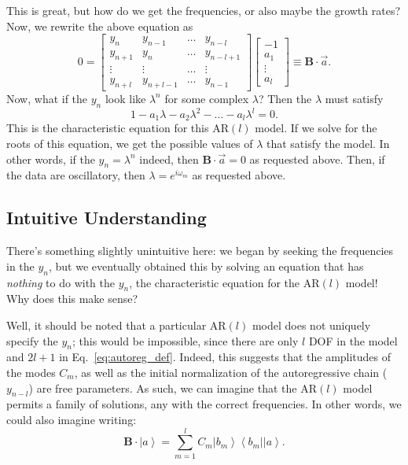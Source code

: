 \documentclass[12pt]{article}
\newcommand*{\bm}[1]{\boldsymbol{\mathbf{#1}}}
\newcommand*{\bra}[1]{\left<#1\right|}
\newcommand*{\ket}[1]{\left|#1\right>}
\begin{document}
This is great, but how do we get the frequencies, or also maybe the growth
rates? Now, we rewrite the above equation as
\begin{equation}
    0 =
    \begin{bmatrix}
        y_{n} & y_{n - 1} & \dots & y_{n - l}\\
        y_{n + 1} & y_{n} & \dots & y_{n - l + 1}\\
        \vdots & \vdots & \dots & \vdots\\
        y_{n + l} & y_{n + l - 1} & \dots & y_{n - 1}
    \end{bmatrix}
    \begin{bmatrix}
        -1\\
        a_1\\
        \vdots\\
        a_l
    \end{bmatrix} \equiv \bm{B} \cdot \vec{a}.
\end{equation}
Now, what if the $y_n$ look like $\lambda^n$ for some complex $\lambda$? Then
the $\lambda$ must satisfy
\begin{equation}
    1 - a_1\lambda - a_2\lambda^2 - \dots - a_l\lambda^l = 0.
\end{equation}
This is the characteristic equation for this $\mathrm{AR}(l)$ model. If we solve
for the roots of this equation, we get the possible values of $\lambda$ that
satisfy the model. In other words, if the $y_n = \lambda^n$ indeed, then $\bm{B}
\cdot \vec{a} = 0$ as requested above. Then, if the data are oscillatory, then
$\lambda = e^{i\omega_m}$ as requested above.

\subsection{Intuitive Understanding}

There's something slightly unintuitive here: we began by seeking the frequencies
in the $y_n$, but we eventually obtained this by solving an equation that has
\emph{nothing} to do with the $y_n$, the characteristic equation for the
$\mathrm{AR}(l)$ model! Why does this make sense?

Well, it should be noted that a particular $\mathrm{AR}(l)$ model does not
uniquely specify the $y_n$; this would be impossible, since there are only $l$
DOF in the model and $2l + 1$ in Eq.~\eqref{eq:autoreg_def}. Indeed, this
suggests that the amplitudes of the modes $C_m$, as well as the initial
normalization of the autoregressive chain ($y_{n - l}$) are free parameters. As
such, we can imagine that the $\mathrm{AR}(l)$ model permits a family of
solutions, any with the correct frequencies. In other words, we could also
imagine writing:
\begin{equation}
    \bm{B} \cdot \ket{a} = \sum\limits_{m=1}^lC_m\ket{b_m}\bra{b_m}\ket{a}.
\end{equation}
\end{document}
